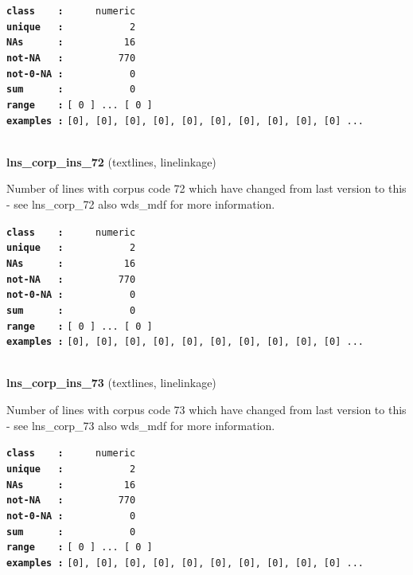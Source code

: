 \documentclass[]{article}
\begin{document}
\textbf{\texttt{class\ \ \ \ :}} \texttt{~~~~~numeric}\\
\textbf{\texttt{unique\ \ \ :}} \texttt{~~~~~~~~~~~2}\\
\textbf{\texttt{NAs\ \ \ \ \ \ :}} \texttt{~~~~~~~~~~16}\\
\textbf{\texttt{not-NA\ \ \ :}} \texttt{~~~~~~~~~770}\\
\textbf{\texttt{not-0-NA\ :}} \texttt{~~~~~~~~~~~0}\\
\textbf{\texttt{sum\ \ \ \ \ \ :}} \texttt{~~~~~~~~~~~0}\\
\textbf{\texttt{range\ \ \ \ :}}
\texttt{{[}\ 0\ {]}\ ...\ {[}\ 0\ {]}}\\
\textbf{\texttt{examples\ :}}
\texttt{{[}0{]},\ {[}0{]},\ {[}0{]},\ {[}0{]},\ {[}0{]},\ {[}0{]},\ {[}0{]},\ {[}0{]},\ {[}0{]},\ {[}0{]}\ ...}\\

~

\textbf{lns\_corp\_ins\_72} (textlines, linelinkage)

Number of lines with corpus code 72 which have changed from last version
to this - see lns\_corp\_72 also wds\_mdf for more information.

\textbf{\texttt{class\ \ \ \ :}} \texttt{~~~~~numeric}\\
\textbf{\texttt{unique\ \ \ :}} \texttt{~~~~~~~~~~~2}\\
\textbf{\texttt{NAs\ \ \ \ \ \ :}} \texttt{~~~~~~~~~~16}\\
\textbf{\texttt{not-NA\ \ \ :}} \texttt{~~~~~~~~~770}\\
\textbf{\texttt{not-0-NA\ :}} \texttt{~~~~~~~~~~~0}\\
\textbf{\texttt{sum\ \ \ \ \ \ :}} \texttt{~~~~~~~~~~~0}\\
\textbf{\texttt{range\ \ \ \ :}}
\texttt{{[}\ 0\ {]}\ ...\ {[}\ 0\ {]}}\\
\textbf{\texttt{examples\ :}}
\texttt{{[}0{]},\ {[}0{]},\ {[}0{]},\ {[}0{]},\ {[}0{]},\ {[}0{]},\ {[}0{]},\ {[}0{]},\ {[}0{]},\ {[}0{]}\ ...}\\

~

\textbf{lns\_corp\_ins\_73} (textlines, linelinkage)

Number of lines with corpus code 73 which have changed from last version
to this - see lns\_corp\_73 also wds\_mdf for more information.

\textbf{\texttt{class\ \ \ \ :}} \texttt{~~~~~numeric}\\
\textbf{\texttt{unique\ \ \ :}} \texttt{~~~~~~~~~~~2}\\
\textbf{\texttt{NAs\ \ \ \ \ \ :}} \texttt{~~~~~~~~~~16}\\
\textbf{\texttt{not-NA\ \ \ :}} \texttt{~~~~~~~~~770}\\
\textbf{\texttt{not-0-NA\ :}} \texttt{~~~~~~~~~~~0}\\
\textbf{\texttt{sum\ \ \ \ \ \ :}} \texttt{~~~~~~~~~~~0}\\
\textbf{\texttt{range\ \ \ \ :}}
\texttt{{[}\ 0\ {]}\ ...\ {[}\ 0\ {]}}\\
\textbf{\texttt{examples\ :}}
\texttt{{[}0{]},\ {[}0{]},\ {[}0{]},\ {[}0{]},\ {[}0{]},\ {[}0{]},\ {[}0{]},\ {[}0{]},\ {[}0{]},\ {[}0{]}\ ...}\\
\end{document}
